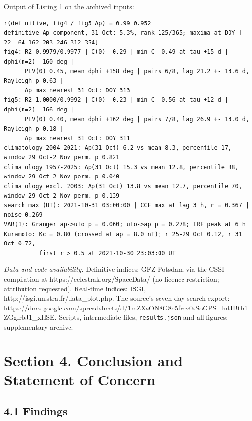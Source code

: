 \documentclass[
  10pt,
  a4paper,
]{article}
\begin{document}
Output of Listing 1 on the archived inputs:

\begin{verbatim}
r(definitive, fig4 / fig5 Ap) = 0.99 0.952
definitive Ap component, 31 Oct: 5.3%, rank 125/365; maxima at DOY [ 22  64 162 203 246 312 354]
fig4: R2 0.9979/0.9977 | C(0) -0.29 | min C -0.49 at tau +15 d | dphi(n=2) -160 deg |
      PLV(0) 0.45, mean dphi +158 deg | pairs 6/8, lag 21.2 +- 13.6 d, Rayleigh p 0.63 |
      Ap max nearest 31 Oct: DOY 313
fig5: R2 1.0000/0.9992 | C(0) -0.23 | min C -0.56 at tau +12 d | dphi(n=2) -166 deg |
      PLV(0) 0.40, mean dphi +162 deg | pairs 7/8, lag 26.9 +- 13.0 d, Rayleigh p 0.18 |
      Ap max nearest 31 Oct: DOY 311
climatology 2004-2021: Ap(31 Oct) 6.2 vs mean 8.3, percentile 17, window 29 Oct-2 Nov perm. p 0.821
climatology 1957-2025: Ap(31 Oct) 15.3 vs mean 12.8, percentile 88, window 29 Oct-2 Nov perm. p 0.040
climatology excl. 2003: Ap(31 Oct) 13.8 vs mean 12.7, percentile 70, window 29 Oct-2 Nov perm. p 0.139
search max (UT): 2021-10-31 03:00:00 | CCF max at lag 3 h, r = 0.367 | noise 0.269
VAR(1): Granger ap->ufo p = 0.060; ufo->ap p = 0.278; IRF peak at 6 h
Kuramoto: Kc = 0.80 (crossed at ap = 8.0 nT); r 25-29 Oct 0.12, r 31 Oct 0.72,
          first r > 0.5 at 2021-10-30 23:03:00 UT
\end{verbatim}

\emph{Data and code availability.} Definitive indices: GFZ Potsdam via
the CSSI compilation at https://celestrak.org/SpaceData/ (no licence
restriction; attribution requested). Real-time indices: ISGI,
http://isgi.unistra.fr/data\_plot.php. The source's seven-day search
export:
https://docs.google.com/spreadsheets/d/1mZXsON8G8e5frev0sSoGPS\_hdJBtb1ZGglrbJ1\_xHSE.
Scripts, intermediate files, \texttt{results.json} and all figures:
supplementary archive.

\hypertarget{section-4.-conclusion-and-statement-of-concern}{%
\section{Section 4. Conclusion and Statement of
Concern}\label{section-4.-conclusion-and-statement-of-concern}}

\hypertarget{findings}{%
\subsection{4.1 Findings}\label{findings}}
\end{document}
